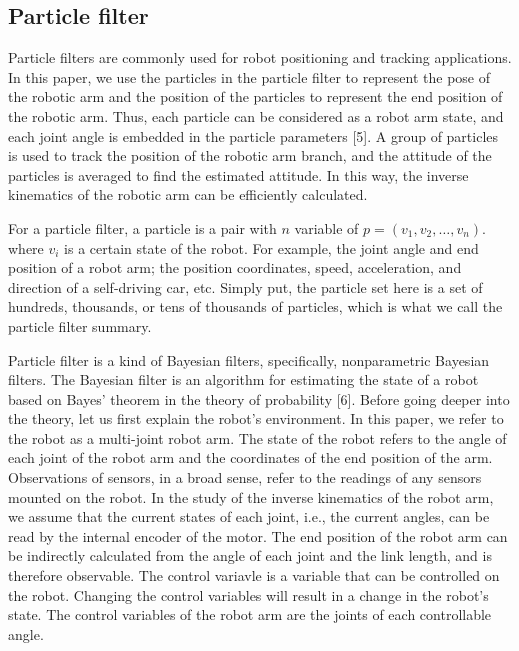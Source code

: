 \documentclass[journal,article,submit,pdftex,moreauthors]{Definitions/mdpi}
\begin{document}
\subsection{Particle filter}
Particle filters are commonly used for robot positioning and tracking applications. In this paper, we use the particles in the particle filter to represent the pose of the robotic arm and the position of the particles to represent the end position of the robotic arm. Thus, each particle can be considered as a robot arm state, and each joint angle is embedded in the particle parameters [5]. A group of particles is used to track the position of the robotic arm branch, and the attitude of the particles is averaged to find the estimated attitude. In this way, the inverse kinematics of the robotic arm can be efficiently calculated.

For a particle filter, a particle is a pair with $n$ variable of $p=(v_1,v_2,\ldots,v_n)$. where $v_i$ is a certain state of the robot. For example, the joint angle and end position of a robot arm; the position coordinates, speed, acceleration, and direction of a self-driving car, etc. Simply put, the particle set here is a set of hundreds, thousands, or tens of thousands of particles, which is what we call the particle filter summary.

Particle filter is a kind of Bayesian filters, specifically, nonparametric Bayesian filters. The Bayesian filter is an algorithm for estimating the state of a robot based on Bayes' theorem in the theory of probability [6]. Before going deeper into the theory, let us first explain the robot's environment. In this paper, we refer to the robot as a multi-joint robot arm. The state of the robot refers to the angle of each joint of the robot arm and the coordinates of the end position of the arm. Observations of sensors, in a broad sense, refer to the readings of any sensors mounted on the robot. In the study of the inverse kinematics of the robot arm, we assume that the current states of each joint, i.e., the current angles, can be read by the internal encoder of the motor. The end position of the robot arm can be indirectly calculated from the angle of each joint and the link length, and is therefore observable. The control variavle is a variable that can be controlled on the robot. Changing the control variables will result in a change in the robot's state. The control variables of the robot arm are the joints of each controllable angle.
\end{document}
